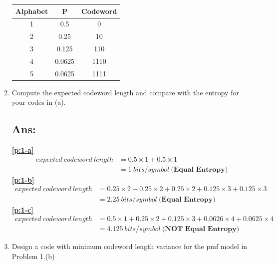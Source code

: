 \documentclass[a4paper, 11pt, oneside]{article} %
\begin{document}
\begin{enumerate}[label=(\alph*)]
\begin{multicols}{2}
\begin{tikzpicture}[level distance=1.8cm,
			level 1/.style={sibling distance=2.5cm},
			level 2/.style={sibling distance=2.5cm},
			level 3/.style={sibling distance=2.5cm},
			level 4/.style={sibling distance=1.5cm}]
	  	\end{tikzpicture}
	  
      	\columnbreak

    	\vfill
      	\begin{tabular}{ |c|c|c| } 
        	\hline
        	Alphabet & P  & Codeword \\
        	\hline
        	1 & 0.5     & 0 \\ 
        	2 & 0.25    & 10 \\  
        	3 & 0.125   & 110 \\  
        	4 & 0.0625  & 1110 \\  
        	5 & 0.0625  & 1111 \\  
        	\hline
        \end{tabular}
		\vfill
	\end{multicols}

	\vspace{2em}

	\item Compute the expected codeword length and compare with the entropy for your 
	codes in (a).
	\subsection*{Ans:}
	\textbf{\ref{p:1-a}}
  	\begin{align*}
    	expected~codeword~length&=0.5 \times 1 + 0.5 \times 1 \\
                            &=1 ~bits/symbol~\textbf{(Equal Entropy)}
  	\end{align*}
  	\textbf{\ref{p:1-b}}
  	\begin{align*}
    	expected~codeword~length&=0.25 \times 2 + 0.25 \times 2 + 0.25 \times 2 + 
                              0.125 \times 3 + 0.125 \times 3 \\
                            &=2.25 ~bits/symbol~\textbf{(Equal Entropy)}
  	\end{align*}
  	\textbf{\ref{p:1-c}}
  	\begin{align*}
    	expected~codeword~length&=0.5 \times 1 + 0.25 \times 2 + 0.125 \times 3 + 
                              0.0626 \times 4 + 0.0625 \times 4 \\
                            &=4.125 ~bits/symbol~\textbf{(NOT Equal Entropy)}
	\end{align*}
	  
	\clearpage

	\item Design a code with minimum codeword length variance for the pmf model in Problem 1.(b)

\end{enumerate}
\end{document}
